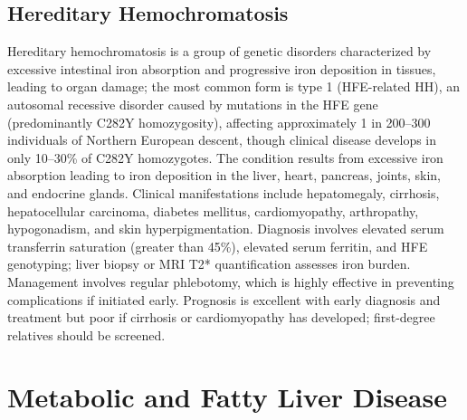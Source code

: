 



\label{sec:Hereditary and Metabolic Liver Diseases}

\subsection{Hereditary Hemochromatosis}
\label{sec:Hereditary Hemochromatosis}
Hereditary hemochromatosis is a group of genetic disorders characterized by excessive intestinal iron absorption and progressive iron deposition in tissues, leading to organ damage; the most common form is type 1 (HFE-related HH), an autosomal recessive disorder caused by mutations in the HFE gene (predominantly C282Y homozygosity), affecting approximately 1 in 200--300 individuals of Northern European descent, though clinical disease develops in only 10--30\% of C282Y homozygotes. The condition results from excessive iron absorption leading to iron deposition in the liver, heart, pancreas, joints, skin, and endocrine glands. Clinical manifestations include hepatomegaly, cirrhosis, hepatocellular carcinoma, diabetes mellitus, cardiomyopathy, arthropathy, hypogonadism, and skin hyperpigmentation. Diagnosis involves elevated serum transferrin saturation (greater than 45\%), elevated serum ferritin, and HFE genotyping; liver biopsy or MRI T2* quantification assesses iron burden. Management involves regular phlebotomy, which is highly effective in preventing complications if initiated early. Prognosis is excellent with early diagnosis and treatment but poor if cirrhosis or cardiomyopathy has developed; first-degree relatives should be screened.

\section{Metabolic and Fatty Liver Disease}


